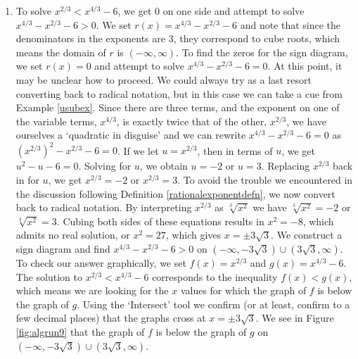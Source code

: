 {
\begin{enumerate}

\item  To solve $x^{2/3} < x^{4/3} - 6$, we get $0$ on one side and attempt to solve $x^{4/3} - x^{2/3} - 6 > 0$.  We set $r(x) = x^{4/3} - x^{2/3} - 6$ and note that since the denominators in the exponents are $3$, they correspond to cube roots, which means the domain of $r$ is $(-\infty, \infty)$. To find the zeros for the sign diagram, we set $r(x) = 0$ and attempt to solve $x^{4/3} - x^{2/3} - 6 = 0$.  At this point, it may be unclear how to proceed.  We could always try as a last resort converting back to radical notation,  but in this case we can take a cue from Example \ref{usubex}.  Since there are three terms, and the exponent on one of the variable terms, $x^{4/3}$, is exactly twice that of the other, $x^{2/3}$, we have ourselves a `quadratic in disguise' and we can rewrite  $ x^{4/3} - x^{2/3} - 6 = 0$ as $\left(x^{2/3}\right)^2 - x^{2/3} - 6=0$.  If we let $u = x^{2/3}$, then in terms of $u$, we get $u^2 - u - 6 = 0$.  Solving for $u$, we obtain $u = -2$ or $u = 3$.  Replacing $x^{2/3}$ back in for $u$, we get $x^{2/3} = -2$ or $x^{2/3} = 3$.  To avoid the trouble we encountered in the discussion following Definition \ref{rationalexponentdefn}, we now convert back to radical notation.  By interpreting $x^{2/3}$ as $\sqrt[3]{x^2}$ we have $\sqrt[3]{x^2} = -2$ or $\sqrt[3]{x^2}= 3$.  Cubing both sides of these equations results in $x^2 = -8$, which admits no real solution, or $x^2 = 27$, which gives $x = \pm 3 \sqrt{3}$.  We construct a sign diagram and find $x^{4/3} - x^{2/3} - 6 > 0$ on $\left(-\infty, -3 \sqrt{3}\right)\cup \left(3 \sqrt{3}, \infty\right)$.  To check our answer graphically, we set $f(x) = x^{2/3}$ and $g(x) = x^{4/3}-6$.  The solution to  $x^{2/3} < x^{4/3} - 6$ corresponds to the inequality $f(x) < g(x)$, which means we are looking for the $x$ values for which the graph of $f$ is below the graph of $g$.  Using the `Intersect' tool we confirm (or at least, confirm to a few decimal places) that the graphs cross at $x= \pm 3\sqrt{3}$.  We see in Figure \ref{fig:algrun9} that the graph of $f$  is below the graph of $g$  on $\left(-\infty, -3 \sqrt{3}\right)\cup \left(3 \sqrt{3}, \infty\right)$.


\end{enumerate}}
